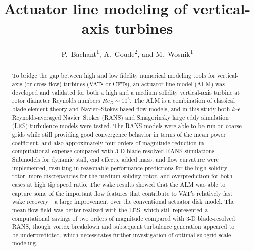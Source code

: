 \documentclass[times]{weauth}
\begin{document}


\title{Actuator line modeling of vertical-axis turbines}

\author{P.~Bachant\textsuperscript{1}, A.~Goude\textsuperscript{2}, and
M.~Wosnik\textsuperscript{1}}

\address{\textsuperscript{1}Center for Ocean Renewable Energy,
University of New Hampshire, 24
Colovos Rd., Durham, NH, 03824, USA \\
\textsuperscript{2}Department of Engineering Sciences,
Division of Electricity, Uppsala University, Uppsala 751 21, Sweden}


\begin{abstract}
    To bridge the gap between high and low fidelity numerical modeling tools for
    vertical-axis (or cross-flow) turbines (VATs or CFTs), an actuator line
    model (ALM) was developed and validated for both a high and a medium
    solidity vertical-axis turbine at rotor diameter Reynolds numbers $Re_D \sim
    10^6$. The ALM is a combination of classical blade element theory and
    Navier--Stokes based flow models, and in this study both $k$--$\epsilon$
    Reynolds-averaged Navier--Stokes (RANS) and Smagorinsky large eddy
    simulation (LES) turbulence models were tested. The RANS models were able to
    be run on coarse grids while still providing good convergence behavior in
    terms of the mean power coefficient, and also approximately four orders of
    magnitude reduction in computational expense compared with 3-D
    blade-resolved RANS simulations. Submodels for dynamic stall, end effects,
    added mass, and flow curvature were implemented, resulting in reasonable
    performance predictions for the high solidity rotor, more discrepancies for
    the medium solidity rotor, and overprediction for both cases at high tip
    speed ratio. The wake results showed that the ALM was able to capture some
    of the important flow features that contribute to VAT's relatively fast wake
    recovery---a large improvement over the conventional actuator disk model.
    The mean flow field was better realized with the LES, which still
    represented a computational savings of two orders of magnitude compared with
    3-D blade-resolved RANS, though vortex breakdown and subsequent turbulence
    generation appeared to be underpredicted, which necessitates further
    investigation of optimal subgrid scale modeling.
\end{abstract}
\end{document}
